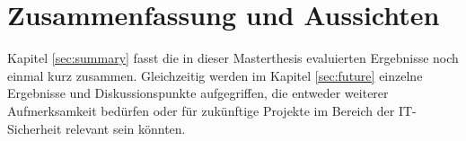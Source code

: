 \chapter{Zusammenfassung und Aussichten}\label{Conclusion}


Kapitel \ref{sec:summary} fasst die in dieser Masterthesis evaluierten Ergebnisse noch einmal kurz zusammen. Gleichzeitig werden im Kapitel \ref{sec:future} einzelne Ergebnisse und Diskussionspunkte aufgegriffen, die entweder weiterer Aufmerksamkeit bedürfen oder für zukünftige Projekte im Bereich der IT-Sicherheit relevant sein könnten.